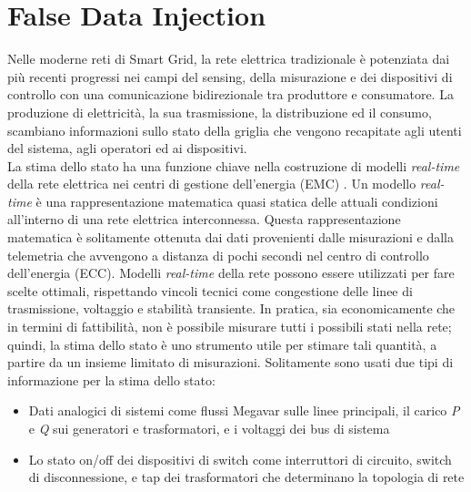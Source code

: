 \section{False Data Injection}
Nelle moderne reti di Smart Grid, la rete elettrica tradizionale è potenziata dai più recenti progressi nei campi del sensing, della misurazione e dei dispositivi di controllo con una comunicazione bidirezionale tra produttore e consumatore. La produzione di elettricità, la sua trasmissione, la distribuzione ed il consumo, scambiano informazioni sullo stato della griglia che vengono recapitate agli utenti del sistema, agli operatori ed ai dispositivi.\\
La stima dello stato ha una funzione chiave nella costruzione di modelli \emph{real-time} della rete elettrica nei centri di gestione dell'energia (EMC) \cite{monticelli}. Un modello \emph{real-time} è una rappresentazione matematica quasi statica delle attuali condizioni all'interno di una rete elettrica interconnessa. Questa rappresentazione matematica è solitamente ottenuta dai dati provenienti dalle misurazioni e dalla telemetria che avvengono a distanza di pochi secondi nel centro di controllo dell'energia (ECC). Modelli \emph{real-time} della rete possono essere utilizzati per fare scelte ottimali, rispettando vincoli tecnici come congestione delle linee di trasmissione, voltaggio e stabilità transiente. In pratica, sia economicamente che in termini di fattibilità, non è possibile misurare tutti i possibili stati nella rete; quindi, la stima dello stato è uno strumento utile per stimare tali quantità, a partire da un insieme limitato di misurazioni. Solitamente sono usati due tipi di informazione per la stima dello stato:
\begin{itemize}
	\item Dati analogici di sistemi come flussi Megavar sulle linee principali, il carico \emph{P} e \emph{Q} sui generatori e trasformatori, e i voltaggi dei bus di sistema
	\item Lo stato on/off dei dispositivi di switch come interruttori di circuito, switch di disconnessione, e tap dei trasformatori che determinano la topologia di rete
\end{itemize}
